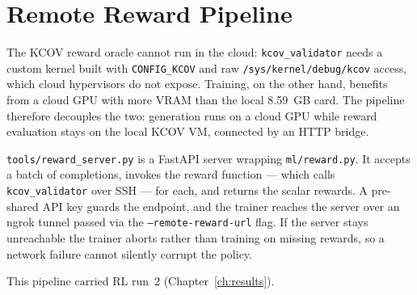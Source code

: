 \section{Remote Reward Pipeline}
\label{sec:remote-reward}

The KCOV reward oracle cannot run in the cloud: \texttt{kcov\_validator} needs a
custom kernel built with \texttt{CONFIG\_KCOV} and raw
\texttt{/sys/kernel/debug/kcov} access, which cloud hypervisors do not expose.
Training, on the other hand, benefits from a cloud GPU with more VRAM than the
local 8.59~GB card. The pipeline therefore decouples the two: generation runs on a
cloud GPU while reward evaluation stays on the local KCOV VM, connected by an HTTP
bridge.

\texttt{tools/reward\_server.py} is a FastAPI server wrapping \texttt{ml/reward.py}.
It accepts a batch of completions, invokes the reward function --- which calls
\texttt{kcov\_validator} over SSH --- for each, and returns the scalar rewards. A
pre-shared API key guards the endpoint, and the trainer reaches the server over an
ngrok tunnel passed via the \texttt{--remote-reward-url} flag. If the server stays
unreachable the trainer aborts rather than training on missing rewards, so a
network failure cannot silently corrupt the policy.

This pipeline carried RL run~2 (Chapter~\ref{ch:results}).
